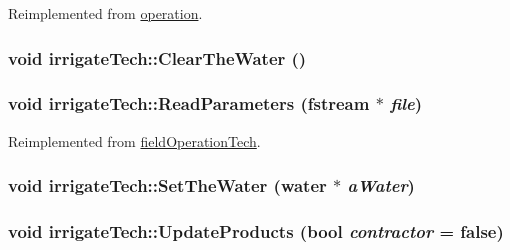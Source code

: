 Reimplemented from \hyperlink{classoperation_a51c5612f29519bc82050ffccf089bc07}{operation}.\hypertarget{classirrigate_tech_a9daf92a6cfd801082fd3201fd7e4e572}{
\subsubsection[{ClearTheWater}]{\setlength{\rightskip}{0pt plus 5cm}void irrigateTech::ClearTheWater ()}}
\label{classirrigate_tech_a9daf92a6cfd801082fd3201fd7e4e572}
\hypertarget{classirrigate_tech_a8c7f11f2ce9cb7e19851c81c69c91d0a}{
\subsubsection[{ReadParameters}]{\setlength{\rightskip}{0pt plus 5cm}void irrigateTech::ReadParameters (fstream $\ast$ {\em file})}}
\label{classirrigate_tech_a8c7f11f2ce9cb7e19851c81c69c91d0a}


Reimplemented from \hyperlink{classfield_operation_tech_a2a2c416f3f3fe8ceb2f1f1b63c149a09}{fieldOperationTech}.\hypertarget{classirrigate_tech_a762110b6144118044760d998985175f0}{
\subsubsection[{SetTheWater}]{\setlength{\rightskip}{0pt plus 5cm}void irrigateTech::SetTheWater ({\bf water} $\ast$ {\em aWater})}}
\label{classirrigate_tech_a762110b6144118044760d998985175f0}
\hypertarget{classirrigate_tech_a5a125198ead652bcf1c8307fbc8ef3b5}{
\subsubsection[{UpdateProducts}]{\setlength{\rightskip}{0pt plus 5cm}void irrigateTech::UpdateProducts (bool {\em contractor} = {\ttfamily false})}}
\label{classirrigate_tech_a5a125198ead652bcf1c8307fbc8ef3b5}


